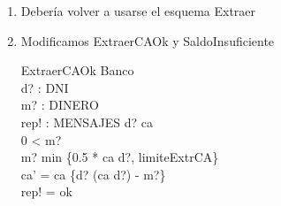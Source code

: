 \documentclass[11pt]{article}
\begin{document}
\begin{enumerate}
    \begin{schema}{ClienteInexistente}
      \Xi Banco \\
      d? : DNI \\
      rep! : MENSAJES
      \where
      d? \notin \dom ca \\
      rep! = clienteInexistente
    \end{schema}

    \begin{schema}{MontoIncorrectoCA}
      \Xi Banco \\
      m? : DINERO \\
      rep! : MENSAJES
      \where
      m? < 0 \\
      rep! = montoNulo
    \end{schema} 

    \begin{schema}{SaldoInsuficiente}
      \Xi Banco \\
      d? : DNI \\
      m?: DINERO \\
      rep! : MENSAJES
      \where
      m? > ca \; d? \\
      d? \in \dom ca \\
      rep! = noPoseeSaldoSuficiente
    \end{schema}

    \begin{schema}{SuperaLimite}
      \Xi Banco \\
      m? : DINERO \\
      rep! : MENSAJES
      \where
      m? > limiteExtrCA \\
      rep! = superaLimite
    \end{schema}


    \begin{zed}
      ExtraerCAE == ClienteInexistente  \lor MontoIncorrectoCA \lor SaldoInsuficiente
      \lor SuperaLimite \\
      ExtraerCA = ExtraerCAOk \lor ExtraerCAE 
    \end{zed}

    \item Debería volver a usarse el esquema Extraer
    \item Modificamos ExtraerCAOk y SaldoInsuficiente
    \begin{schema}{ExtraerCAOk}
      \Delta Banco \\
      d? : DNI \\
      m? : DINERO \\
      rep! : MENSAJES 
      \where
      d? \in \dom ca \\
      0 < m?\\
      m? \leq min \{0.5 * ca \; d?, \; limiteExtrCA\}\\
      ca' = ca \oplus \{d? \mapsto (ca \; d?) - m?\} \\
      rep! = ok
    \end{schema}


\end{enumerate}
\end{document}
